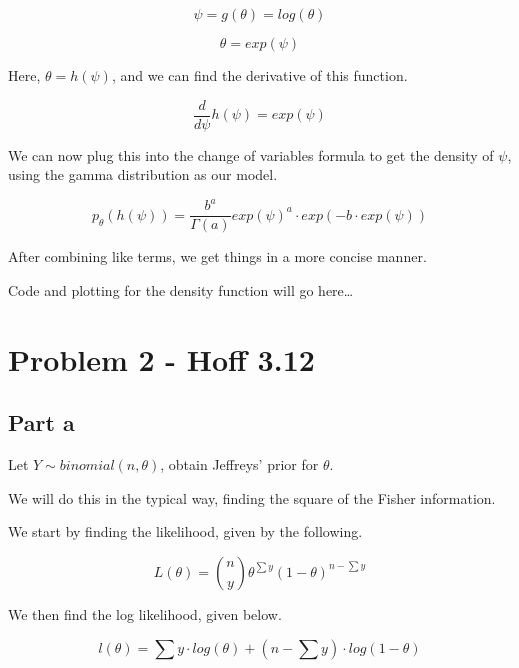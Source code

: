 \documentclass[12pt, letterpaper]{article}
\begin{document}
\begin{equation} 
\psi = g(\theta) = log(\theta) 
\end{equation} 

\begin{equation} 
\theta = exp(\psi) 
\end{equation} 

Here, $\theta = h(\psi)$, and we can find the derivative of this function. 

\begin{equation} 
\frac{d}{d\psi}h(\psi) = exp(\psi) 
\end{equation} 

We can now plug this into the change of variables formula to get the density of $\psi$, using the gamma distribution as our model. 

\begin{equation} 
  p_{\theta}(h(\psi)) = \frac{b^a}{\Gamma(a)}exp(\psi)^a \cdot exp(-b \cdot exp(\psi))  
\end{equation} 

After combining like terms, we get things in a more concise manner. 

Code and plotting for the density function will go here\dots 

\section{Problem 2 - Hoff 3.12}

\subsection{Part a}

Let $Y \sim binomial(n, \theta)$, obtain Jeffreys' prior for $\theta$. 

We will do this in the typical way, finding the square of the Fisher information. 

We start by finding the likelihood, given by the following. 

\begin{equation} 
  L(\theta) = \binom{n}{y}\theta^{\sum y}(1-\theta)^{n - \sum y} 
\end{equation} 

We then find the log likelihood, given below. 

\begin{equation} 
  l(\theta) = \sum y \cdot log(\theta) + (n - \sum y) \cdot log(1 - \theta)
\end{equation} 
\end{document}
